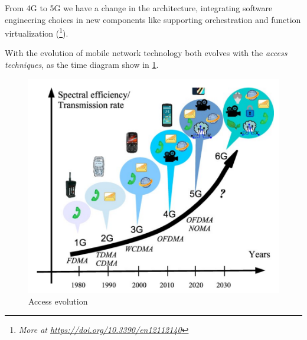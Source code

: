 \documentclass[10pt,a4paper]{report}
\theoremstyle{definition}
\begin{document}
From 4G to 5G we have a change in the architecture, integrating software engineering choices in new components like supporting orchestration and function virtualization (\footnote{\textit{More at \href{https://doi.org/10.3390/en12112140}{https://doi.org/10.3390/en12112140}}}).

With the evolution of mobile network technology both evolves with the \textit{access techniques}, as the time diagram show in \ref{access-evolution}.
\begin{figure}[h!]
	\centering\includegraphics[scale=0.30]{images/Pasted image 20230301173232.png}
	\caption{Access evolution}
	\label{access-evolution}
\end{figure}
\end{document}
